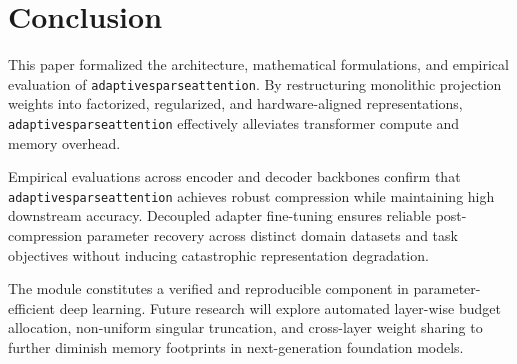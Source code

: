 \section{Conclusion}
This paper formalized the architecture, mathematical formulations, and empirical evaluation of \texttt{adaptivesparseattention}. By restructuring monolithic projection weights into factorized, regularized, and hardware-aligned representations, \texttt{adaptivesparseattention} effectively alleviates transformer compute and memory overhead.

Empirical evaluations across encoder and decoder backbones confirm that \texttt{adaptivesparseattention} achieves robust compression while maintaining high downstream accuracy. Decoupled adapter fine-tuning ensures reliable post-compression parameter recovery across distinct domain datasets and task objectives without inducing catastrophic representation degradation.

The module constitutes a verified and reproducible component in parameter-efficient deep learning. Future research will explore automated layer-wise budget allocation, non-uniform singular truncation, and cross-layer weight sharing to further diminish memory footprints in next-generation foundation models.
